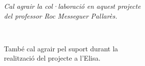 \cleardoublepage


%  
%  

\setlength{\descriptionwidth}{0.8\linewidth}
\printglossary

\cleardoublepage
\pagestyle{empty}
\vspace*{5cm}
\begin{flushright}
\it
Cal agrair la col·laboració en aquest projecte \\
del professor Roc Messeguer Pallarès.

\

També cal agrair pel suport durant la \\
realització del projecte a l'Elisa.
\end{flushright}
\cleardoublepage
